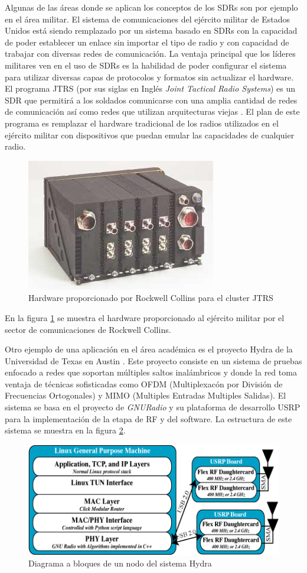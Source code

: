 Algunas de las \'areas donde se aplican los conceptos de los SDRs son por
ejemplo en el \'area militar. El sistema de comunicaciones del ej\'ercito
militar de Estados Unidos est\'a siendo remplazado por un sistema basado en SDRs
con la capacidad de poder establecer un enlace sin importar el tipo de radio y
con capacidad de trabajar con diversas redes de comunicaci\'on. La ventaja
principal que los l\'ideres militares ven en el uso de SDRs es la habilidad de
poder configurar el sistema para utilizar diversas capas de protocolos y
formatos sin actualizar el hardware. El programa JTRS (por sus siglas en Ingl\'es
\emph{Joint Tactical Radio Systems}) es un SDR que permitir\'a a los soldados
comunicarse con una amplia cantidad de redes de comunicaci\'on as\'i como
redes que utilizan arquitecturas viejas \cite{mchale}. El plan de
este programa es remplazar el hardware tradicional de los radios utilizados en
el ej\'ercito militar con dispositivos que puedan emular las capacidades de
cualquier radio.

\begin{figure}[pt]
\centering
	\includegraphics[scale=0.7]{figs/jtrs}
	\caption{Hardware proporcionado por Rockwell Collins para el cluster JTRS \protect\cite{mchale}}
	\label{fig:jtrs}
\end{figure}

En la figura \ref{fig:jtrs} se muestra el hardware proporcionado al ej\'ercito
militar por el sector de comunicaciones de Rockwell Collins.

Otro ejemplo de una aplicaci\'on en el \'area acad\'emica es el proyecto Hydra
de la Universidad de Texas en Austin \cite{hydra}. Este proyecto consiste en un
sistema de pruebas enfocado a redes que soportan m\'ultiples saltos
inal\'ambricos y donde la red toma ventaja de t\'ecnicas sofisticadas como OFDM (Multiplexac\'on por Divisi\'on de Frecuencias
Ortogonales) y MIMO (Multiples Entradas Multiples Salidas). El sistema se basa en el proyecto de \emph{GNURadio} y su plataforma
de desarrollo USRP \cite{ettus} para la implementaci\'on de la etapa de RF y del
software. La estructura de este sistema se muestra en la figura \ref{fig:hydra}.

\begin{figure}[hpt]
\centering
	\includegraphics[scale=0.7]{figs/hydra}
	\vspace{0.5in}
	\caption{Diagrama a bloques de un nodo del sistema Hydra \protect\cite{hydra}}
	\label{fig:hydra}
\end{figure}
